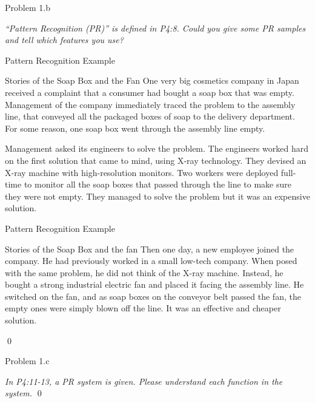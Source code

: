 \documentclass[
        ]{beamer}
\begin{document}
        \begin{frame}[c]{Problem 1.b}
            \begin{overprint}            
            \emph{``Pattern Recognition (PR)'' is defined in P4:8. Could you give some PR samples and tell which features you use?}       
            	\onslide<2>  %
            \end{overprint}            
        \end{frame}
        
        \begin{frame}[c,shrink]{Pattern Recognition Example}
            \begin{block}{Stories of the Soap Box and the Fan}
One very big cosmetics company in Japan received a complaint that a consumer had bought a soap box that was empty. Management of the company immediately traced the problem to the assembly line, that conveyed all the packaged boxes of soap to the delivery department. For some reason, one soap box went through the assembly line empty. 

Management asked its engineers to solve the problem. The engineers worked hard on the first solution that came to mind, using X-ray technology. They devised an X-ray machine with high-resolution monitors. Two workers were deployed full-time to monitor all the soap boxes that passed through the line to make sure they were not empty. They managed to solve the problem but it was an expensive solution. 
\end{block}
        \end{frame}
        \begin{frame}[c,shrink]{Pattern Recognition Example}
            \begin{block}{Stories of the Soap Box and the fan}
Then one day, a new employee joined the company. He had previously worked in a small low-tech company. When posed with the same problem, he did not think of the X-ray machine. Instead, he bought a strong industrial electric fan and placed it facing the assembly line. He switched on the fan, and as soap boxes on the conveyor belt passed the fan, the empty ones were simply blown off the line. It was an effective and cheaper solution.
\end{block}\qed
        \end{frame}
        
        \begin{frame}[c]{Problem 1.c}
            \begin{overprint}            
            \emph{In P4:11-13, a PR system is given. Please understand each function in the system.}
            	\onslide<2>  %
            	\onslide<3>  %
            	\onslide<4>  %
            		\qed
            \end{overprint}            
        \end{frame}
        
\end{document}
